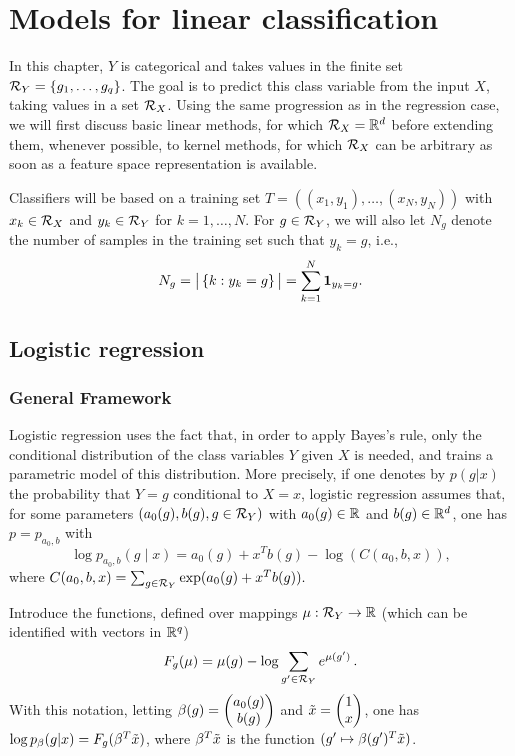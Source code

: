 \chapter{Models for linear classification}
\label{chap:lin.class}
In this chapter, $Y$ is categorical and takes values in the finite set ${\mathcal R}_Y = \left\{ g_1,
\ldots, g_q \right\}$. The goal is to predict this class variable from the
input  $X$, taking values in a set ${\mathcal R}_X$. Using the same progression as in the regression case, we will first discuss basic linear methods, for which ${\mathcal R}_X = {\mathbb{R}}^d$ before extending them, whenever possible, to kernel methods, for which ${\mathcal R}_X$ can be arbitrary as soon as a feature space representation is available. 

Classifiers will be based on a training set $T = ((x_1, y_1), \ldots, (x_N, y_N))$ with $x_k\in{\mathcal R}_X$ and $y_k\in {\mathcal R}_Y$ for $k=1, \ldots, N$. For $g\in {\mathcal R}_Y$, we will also let $N_g$ denote the number of samples in the training set such that $y_k = g$, i.e., 
\[
N_g = \big|\left\{ k: y_k=g \right\}\big| = \sum_{k=1}^N {\bm 1}_{y_k=g}.
\]

\section{Logistic regression} 

\subsection{General Framework}
Logistic regression uses the fact that, in order to apply  Bayes's
rule, only the conditional distribution of the class variables $Y$
given $X$ is needed, and trains a parametric model of this distribution. More precisely, if one denotes by $p(g|x)$  the probability that  $Y=g$ conditional to $X=x$, logistic regression assumes that, for some parameters $({a_0}(g), b(g), g\in {\mathcal R}_Y)$ with ${a_0}(g) \in {\mathbb{R}}$ and $b(g)\in {\mathbb{R}}^{d}$, one has $p = p_{{a_0},b}$ with 
\[
\log p_{{a_0},b}(g\mid x) = {a_0}(g) +  x^T b(g) - \log(C({a_0}, b, x)),
\]
where
$C({a_0}, b, x) = \sum_{g\in {\mathcal R}_Y} \exp({a_0}(g) + x^T b(g)).$

Introduce the functions, defined over mappings $\mu: {\mathcal R}_Y \to {\mathbb{R}}$ (which can be identified with vectors in ${\mathbb{R}}^q$)  
\begin{equation}
\label{eq:log.reg.F}
F_g(\mu) = \mu(g) - \log \sum_{g'\in {\mathcal R}_Y} e^{\mu(g')}\,.
\end{equation}
With this notation, letting $\beta(g) = \begin{pmatrix}{a_0}(g)\\ b(g)\end{pmatrix}$ and ${\tilde{x}} = \begin{pmatrix}1\\ x\end{pmatrix}$, one has 
$\log p_{\beta}(g|x) = F_g(\beta^T{\tilde{x}})$, where $\beta^T{\tilde{x}}$ is the function $(g'\mapsto \beta(g')^T{\tilde{x}})$.  

